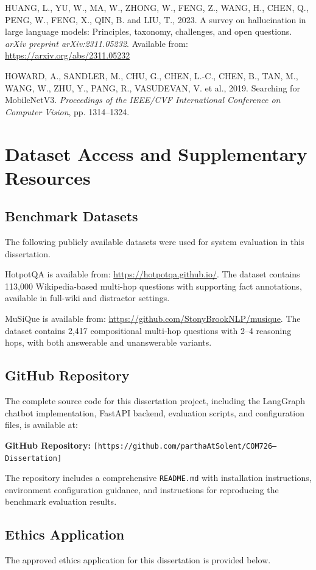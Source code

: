 \documentclass[12pt,a4paper]{article}
\begin{document}
HUANG, L., YU, W., MA, W., ZHONG, W., FENG, Z., WANG, H., CHEN, Q., PENG, W., FENG, X., QIN, B. and LIU, T., 2023. A survey on hallucination in large language models: Principles, taxonomy, challenges, and open questions. \textit{arXiv preprint arXiv:2311.05232}. Available from: \url{https://arxiv.org/abs/2311.05232}

HOWARD, A., SANDLER, M., CHU, G., CHEN, L.-C., CHEN, B., TAN, M., WANG, W., ZHU, Y., PANG, R., VASUDEVAN, V. et al., 2019. Searching for MobileNetV3. \textit{Proceedings of the IEEE/CVF International Conference on Computer Vision}, pp. 1314--1324.

\newpage
\appendix

\section{Dataset Access and Supplementary Resources}
\label{app:datasets}

\subsection{Benchmark Datasets}

The following publicly available datasets were used for system evaluation in this dissertation.

HotpotQA is available from: \url{https://hotpotqa.github.io/}. The dataset contains 113,000 Wikipedia-based multi-hop questions with supporting fact annotations, available in full-wiki and distractor settings.

MuSiQue is available from: \url{https://github.com/StonyBrookNLP/musique}. The dataset contains 2,417 compositional multi-hop questions with 2--4 reasoning hops, with both answerable and unanswerable variants.

\subsection{GitHub Repository}

The complete source code for this dissertation project, including the LangGraph chatbot implementation, FastAPI backend, evaluation scripts, and configuration files, is available at:

\textbf{GitHub Repository:} \texttt{[https://github.com/parthaAtSolent/COM726---Dissertation]}

The repository includes a comprehensive \texttt{README.md} with installation instructions, environment configuration guidance, and instructions for reproducing the benchmark evaluation results.

\subsection{Ethics Application}
\label{app:ethics}

The approved ethics application for this dissertation is provided below.


\end{document}
